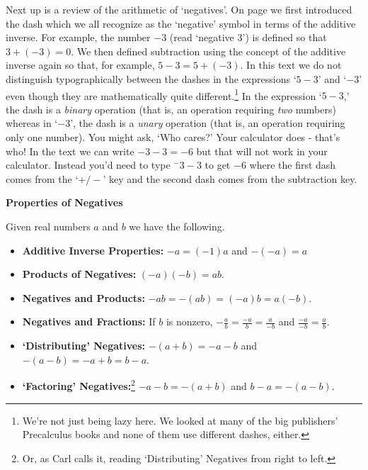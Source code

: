\documentclass{ximera}
\begin{document}
Next up is a review of the arithmetic of `negatives'. On page \pageref{realnumberaddition} we first introduced the dash which we all recognize as the `negative' symbol in terms of the additive inverse.  For example, the number $-3$ (read `negative $3$') is defined so that $3 + (-3) = 0$.  We then defined subtraction using the concept of the additive inverse again so that, for example, $5 - 3 = 5 + (-3)$.  In this text we do not distinguish typographically between the dashes in the expressions `$5-3$' and `$-3$' even though they are mathematically quite different.\footnote{We're not just being lazy here.  We looked at many of the big publishers' Precalculus books and none of them use different dashes, either.} In the expression `$5-3$,' the dash is a \textit{binary} operation (that is, an operation requiring \textit{two} numbers) whereas in `$-3$', the dash is a \textit{unary} operation (that is, an operation requiring only one number).  You might ask, `Who cares?'  Your calculator does - that's who!  In the text we can write $-3 - 3 = -6$ but that will not work in your calculator.  Instead you'd need to type $^{-}3 - 3$ to get $-6$ where the first dash comes from the `$+/-$' key and the second dash comes from the subtraction key.

\medskip

\label{propertiesofnegatives}


\centerline{\textbf{Properties of Negatives}}
\smallskip
Given real numbers $a$ and $b$ we have the following.  

\begin{itemize}

\item  \textbf{Additive Inverse Properties:}  $-a = (-1)a$ and $-(-a) = a$

\item  \textbf{Products of Negatives:} $(-a)(-b) = ab$. 

\item  \textbf{Negatives and Products:} $-ab = -(ab) = (-a)b = a(-b)$.

\item  \textbf{Negatives and Fractions:} If $b$ is nonzero, $-\frac{a}{b} = \frac{-a}{b} = \frac{a}{-b}$ and $\frac{-a}{-b} = \frac{a}{b}$.

\item  \textbf{`Distributing' Negatives:}  $-(a+b) = -a-b$ and $-(a-b) = -a + b = b-a$.

\item  \textbf{`Factoring' Negatives:}\footnote{Or, as Carl calls it, reading `Distributing' Negatives from right to left.} $-a-b = -(a+b)$ and $b-a = -(a-b)$.

\end{itemize}
\end{document}
